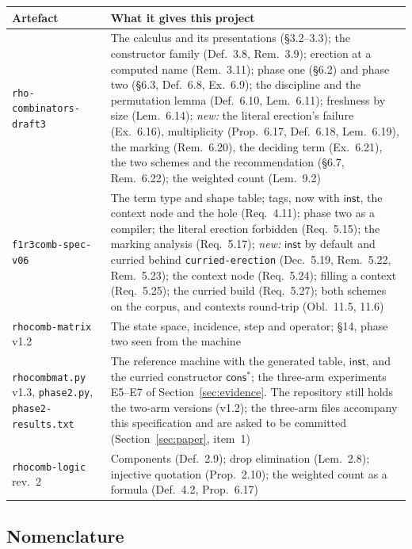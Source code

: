 \documentclass[11pt,a4paper]{article}
\newcommand{\code}[1]{\texttt{#1}}
\theoremstyle{definition}
\theoremstyle{plain}
\newcommand{\inst}{\mathsf{inst}}
\newcommand{\cstar}{\mathsf{cons}^{*}}
\begin{document}
\begin{center}
\begin{tabularx}{\linewidth}{@{}l>{\raggedright\arraybackslash}X@{}}
\toprule
Artefact & What it gives this project\\
\midrule
\code{rho-combinators-draft3} & The calculus and its presentations
(\S3.2--3.3); the constructor family (Def.~3.8, Rem.~3.9); erection at a
computed name (Rem.~3.11); phase one (\S6.2) and phase two (\S6.3, Def.~6.8,
Ex.~6.9); the discipline and the permutation lemma (Def.~6.10, Lem.~6.11);
freshness by size (Lem.~6.14); \emph{new:} the literal erection's failure
(Ex.~6.16), multiplicity (Prop.~6.17, Def.~6.18, Lem.~6.19), the marking
(Rem.~6.20), the deciding term (Ex.~6.21), the two schemes and the
recommendation (\S6.7, Rem.~6.22); the weighted count (Lem.~9.2)\\
\code{f1r3comb-spec-v06} & The term type and shape table; tags, now with
$\inst$, the context node and the hole (Req.~4.11); phase two as a compiler;
the literal erection forbidden (Req.~5.15); the marking analysis
(Req.~5.17); \emph{new:} $\inst$ by default and curried behind
\code{curried-erection} (Dec.~5.19, Rem.~5.22, Rem.~5.23); the context node
(Req.~5.24); filling a context (Req.~5.25); the curried build
(Req.~5.27); both schemes on the corpus, and contexts round-trip
(Obl.~11.5, 11.6)\\
\code{rhocomb-matrix} v1.2 & The state space, incidence, step and operator;
\S14, phase two seen from the machine\\
\code{rhocombmat.py} v1.3, \code{phase2.py}, \code{phase2-results.txt} & The
reference machine with the generated table, $\inst$, and the curried
constructor $\cstar$; the three-arm experiments E5--E7 of
Section~\ref{sec:evidence}. The repository still holds the two-arm versions
(v1.2); the three-arm files accompany this specification and are asked to be
committed (Section~\ref{sec:paper}, item~1)\\
\code{rhocomb-logic} rev.~2 & Components (Def.~2.9); drop elimination
(Lem.~2.8); injective quotation (Prop.~2.10); the weighted count as a formula
(Def.~4.2, Prop.~6.17)\\
\bottomrule
\end{tabularx}
\end{center}

\subsection{Nomenclature}\label{sec:nomen}
\end{document}
